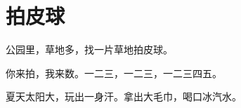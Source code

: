 \documentclass[12pt,UTF-8,openany]{ctexbook}
\begin{document}
\hanzibox{}\hanzibox{}\hanzibox{}\hanzibox{}\hspace{1em}\hanzibox{}\hanzibox{}\hanzibox{}\hanzibox{}

\hanzibox{}\hanzibox{}\hanzibox{}\hanzibox{}\hspace{1em}\hanzibox{}\hanzibox{}\hanzibox{}\hanzibox{}

\hanzibox{}\hanzibox{}\hanzibox{}\hanzibox{}\hspace{1em}\hanzibox{}\hanzibox{}\hanzibox{}\hanzibox{}






\chapter{拍皮球}

\begin{large}
    
    公园里，草地多，找一片草地拍皮球。
    
    你来拍，我来数。一二三，一二三，一二三四五。
    
    夏天太阳大，玩出一身汗。拿出大毛巾，喝口冰汽水。
    
\end{large}


\clearpage

\begin{center}
    
    
    
\end{center}


\hanzibox{}\hanzibox{}\hanzibox{}\hanzibox{}\hspace{1em}\hanzibox{}\hanzibox{}\hanzibox{}\hanzibox{}

\hanzibox{}\hanzibox{}\hanzibox{}\hanzibox{}\hspace{1em}\hanzibox{}\hanzibox{}\hanzibox{}\hanzibox{}

\hanzibox{}\hanzibox{}\hanzibox{}\hanzibox{}\hspace{1em}\hanzibox{}\hanzibox{}\hanzibox{}\hanzibox{}

\hanzibox{}\hanzibox{}\hanzibox{}\hanzibox{}\hspace{1em}\hanzibox{}\hanzibox{}\hanzibox{}\hanzibox{}
\end{document}
